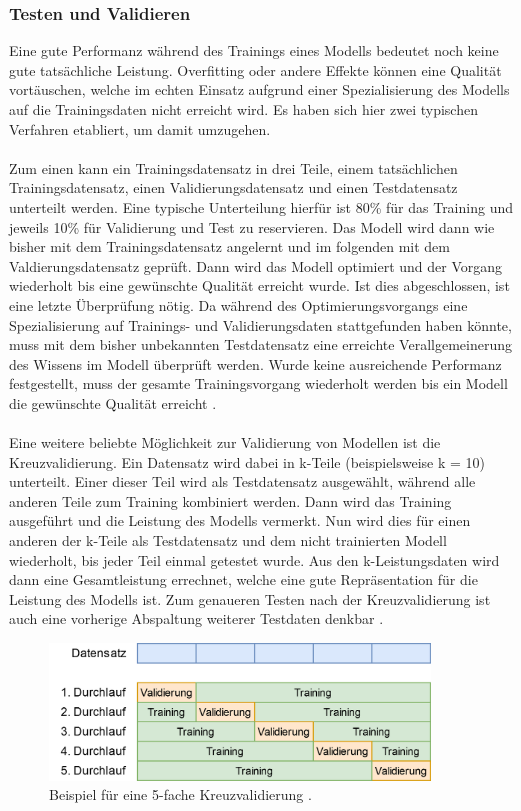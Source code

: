 \documentclass[11pt,bibliography=totocnumbered]{scrartcl}
\begin{document}
\subsubsection{Testen und Validieren}
\label{validation}
Eine gute Performanz während des Trainings eines Modells bedeutet noch keine gute tatsächliche Leistung. Overfitting oder andere Effekte können eine Qualität vortäuschen, welche im echten Einsatz aufgrund einer Spezialisierung des Modells auf die Trainingsdaten nicht erreicht wird. Es haben sich hier zwei typischen Verfahren etabliert, um damit umzugehen. 
\\\\
Zum einen kann ein Trainingsdatensatz in drei Teile, einem tatsächlichen Trainingsdatensatz, einen Validierungsdatensatz und einen Testdatensatz unterteilt werden. Eine typische Unterteilung hierfür ist 80\% für das Training und jeweils 10\% für Validierung und Test zu reservieren. Das Modell wird dann wie bisher mit dem Trainingsdatensatz angelernt und im folgenden mit dem Valdierungsdatensatz geprüft. Dann wird das Modell optimiert und der Vorgang wiederholt bis eine gewünschte Qualität erreicht wurde. Ist dies  abgeschlossen, ist eine letzte Überprüfung nötig. Da während des Optimierungsvorgangs eine Spezialisierung auf Trainings- und Validierungsdaten stattgefunden haben könnte, muss mit dem bisher unbekannten Testdatensatz eine erreichte Verallgemeinerung des Wissens im Modell überprüft werden. Wurde keine ausreichende Performanz festgestellt, muss der gesamte Trainingsvorgang wiederholt werden bis ein Modell die gewünschte Qualität erreicht \cite[S.30-31]{MACHINE_LEARNING}\cite[S.43-44]{BA}.
\\\\
Eine weitere beliebte Möglichkeit zur Validierung von Modellen ist die Kreuzvalidierung. Ein Datensatz wird dabei in k-Teile (beispielsweise k = 10) unterteilt. Einer dieser Teil wird als Testdatensatz ausgewählt, während alle anderen Teile zum Training kombiniert werden. Dann wird das Training ausgeführt und die Leistung des Modells vermerkt. Nun wird dies für einen anderen der k-Teile als Testdatensatz und dem nicht trainierten Modell wiederholt, bis jeder Teil einmal getestet wurde. Aus den k-Leistungsdaten wird dann eine Gesamtleistung errechnet, welche eine gute Repräsentation für die Leistung des Modells ist. Zum genaueren Testen nach der Kreuzvalidierung ist auch eine vorherige Abspaltung weiterer Testdaten denkbar \cite[S.22]{DEEP_LEARNING}\cite[S.44]{BA}.
\begin{figure}[H]
	\centering
	\includegraphics[width=0.90\textwidth]{kreuzvalidierung}
	\vspace*{-3mm}
	\caption[Beispiel für Kreuzvalidierung]{Beispiel für eine 5-fache Kreuzvalidierung \cite[S.44]{BA}.}
	\label{fig:crossvalidation}
\end{figure}
\end{document}
